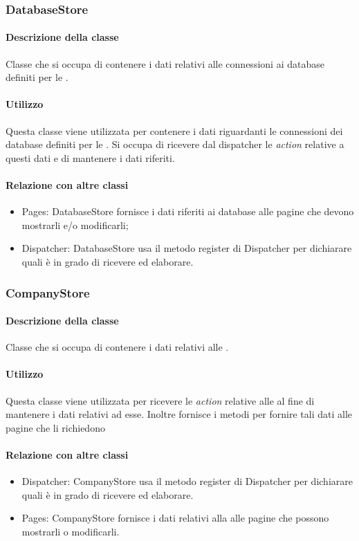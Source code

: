 \subsubsection{DatabaseStore}
\paragraph*{Descrizione della classe}
Classe che si occupa di contenere i dati relativi alle connessioni ai database definiti per le .
\paragraph*{Utilizzo}
Questa classe viene utilizzata per contenere i dati riguardanti le connessioni dei database definiti per le . Si occupa di ricevere dal dispatcher le \textit{action} relative a questi dati e di mantenere i dati riferiti.
\paragraph*{Relazione con altre classi}
\begin{itemize}
\item Pages: DatabaseStore fornisce i dati riferiti ai database alle pagine che devono mostrarli e/o modificarli;
\item Dispatcher: DatabaseStore usa il metodo register di Dispatcher per dichiarare quali  è in grado di ricevere ed elaborare.
\end{itemize}

\subsubsection{CompanyStore}
\paragraph*{Descrizione della classe}
Classe che si occupa di contenere i dati relativi alle .
\paragraph*{Utilizzo}
Questa classe viene utilizzata per ricevere le \textit{action} relative alle  al fine di mantenere i dati relativi ad esse. Inoltre fornisce i metodi per fornire tali dati alle pagine che li richiedono
\paragraph*{Relazione con altre classi}
\begin{itemize}
\item Dispatcher: CompanyStore usa il metodo register di Dispatcher per dichiarare quali  è in grado di ricevere ed elaborare.
\item Pages: CompanyStore fornisce i dati relativi alla  alle pagine che possono mostrarli o modificarli.
\end{itemize}

